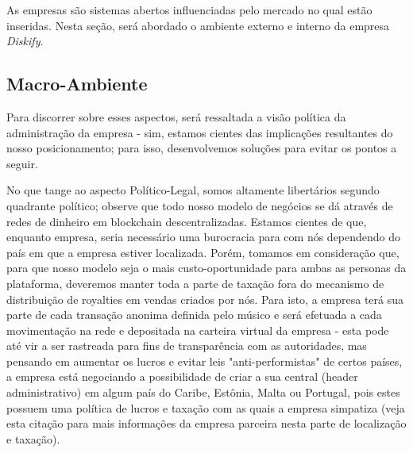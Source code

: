 \documentclass[onecolumn,12pt]{asme2ej}
\begin{document}
As empresas são sistemas abertos influenciadas pelo mercado no qual estão
inseridas. Nesta seção, será abordado o ambiente externo e interno da empresa {\it Diskify}.

\subsection{Macro-Ambiente}

Para discorrer sobre esses aspectos, será ressaltada a visão política da administração da empresa - sim, estamos cientes das implicações resultantes do nosso posicionamento; para isso, desenvolvemos soluções para evitar os pontos a seguir.

No que tange ao aspecto Político-Legal, somos altamente libertários segundo quadrante político\cite{espp}; observe que todo nosso modelo de negócios se dá através de redes de dinheiro em blockchain descentralizadas. Estamos cientes de que, enquanto empresa, seria necessário uma burocracia para com nós dependendo do país em que a empresa estiver localizada. Porém, tomamos em consideração que, para que nosso modelo seja o mais custo-oportunidade para ambas as personas da plataforma, deveremos manter toda a parte de taxação fora do mecanismo de distribuição de royalties em vendas criados por nós. Para isto, a empresa terá sua parte de cada transação anonima definida pelo músico e será efetuada a cada movimentação na rede e depositada na carteira virtual da empresa - esta pode até vir a ser rastreada para fins de transparência com as autoridades, mas pensando em aumentar os lucros e evitar leis "anti-performistas" de certos países, a empresa está negociando a possibilidade de criar a sua central (header administrativo) em algum país do Caribe, Estônia, Malta ou Portugal, pois estes possuem uma política de lucros e taxação com as quais a empresa simpatiza \cite{crpt} (veja esta citação para mais informações da empresa parceira nesta parte de localização e taxação).
\end{document}
